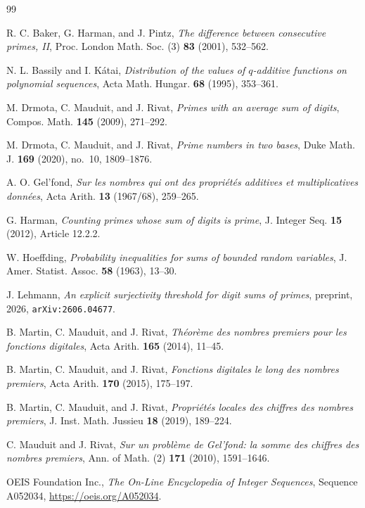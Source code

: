 \documentclass[11pt,reqno]{amsart}
\theoremstyle{plain}
\theoremstyle{definition}
\begin{document}
\begin{thebibliography}{99}

 R. C. Baker, G. Harman, and J. Pintz, \emph{The difference between consecutive primes, II}, Proc. London Math. Soc. (3) \textbf{83} (2001), 532--562.

 N. L. Bassily and I. K\'atai, \emph{Distribution of the values of $q$-additive functions on polynomial sequences}, Acta Math. Hungar. \textbf{68} (1995), 353--361.

 M. Drmota, C. Mauduit, and J. Rivat, \emph{Primes with an average sum of digits}, Compos. Math. \textbf{145} (2009), 271--292.

 M. Drmota, C. Mauduit, and J. Rivat, \emph{Prime numbers in two bases}, Duke Math. J. \textbf{169} (2020), no.~10, 1809--1876.

 A. O. Gel'fond, \emph{Sur les nombres qui ont des propri\'et\'es additives et multiplicatives donn\'ees}, Acta Arith. \textbf{13} (1967/68), 259--265.

 G. Harman, \emph{Counting primes whose sum of digits is prime}, J. Integer Seq. \textbf{15} (2012), Article 12.2.2.

 W. Hoeffding, \emph{Probability inequalities for sums of bounded random variables}, J. Amer. Statist. Assoc. \textbf{58} (1963), 13--30.

 J. Lehmann, \emph{An explicit surjectivity threshold for digit sums of primes}, preprint, 2026, \texttt{arXiv:2606.04677}.

 B. Martin, C. Mauduit, and J. Rivat, \emph{Th\'eor\`eme des nombres premiers pour les fonctions digitales}, Acta Arith. \textbf{165} (2014), 11--45.

 B. Martin, C. Mauduit, and J. Rivat, \emph{Fonctions digitales le long des nombres premiers}, Acta Arith. \textbf{170} (2015), 175--197.

 B. Martin, C. Mauduit, and J. Rivat, \emph{Propri\'et\'es locales des chiffres des nombres premiers}, J. Inst. Math. Jussieu \textbf{18} (2019), 189--224.

 C. Mauduit and J. Rivat, \emph{Sur un probl\`eme de Gel'fond: la somme des chiffres des nombres premiers}, Ann. of Math. (2) \textbf{171} (2010), 1591--1646.

 OEIS Foundation Inc., \emph{The On-Line Encyclopedia of Integer Sequences}, Sequence A052034, \url{https://oeis.org/A052034}.

\end{thebibliography}
\end{document}
